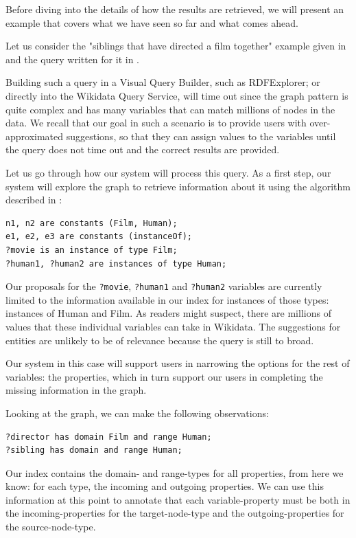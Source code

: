 Before diving into the details of how the results are retrieved, we will present an example that covers what we have seen so far and what comes ahead.

\begin{example}

Let us consider the "siblings that have directed a film together" example given in  and the query written for it in .

Building such a query in a Visual Query Builder, such as RDFExplorer; or directly into the Wikidata Query Service, will time out since the graph pattern is quite complex and has many variables that can match millions of nodes in the data. We recall that our goal in such a scenario is to provide users with over-approximated suggestions, so that they can assign values to the variables until the query does not time out and the correct results are provided.

Let us go through how our system will process this query. 
As a first step, our system will explore the graph to retrieve information about it using the algorithm described in :
\begin{verbatim}
n1, n2 are constants (Film, Human);
e1, e2, e3 are constants (instanceOf);
?movie is an instance of type Film;
?human1, ?human2 are instances of type Human;
\end{verbatim}

Our proposals for the \texttt{?movie}, \texttt{?human1} and \texttt{?human2} variables are currently limited to the information available in our index for instances of those types: instances of Human and Film. As readers might suspect, there are millions of values that these individual variables can take in Wikidata. The suggestions for entities are unlikely to be of relevance because the query is still to broad.

Our system in this case will support users in narrowing the options for the rest of variables: the properties, which in turn support our users in completing the missing information in the graph.

Looking at the graph, we can make the following observations:
\begin{verbatim}
?director has domain Film and range Human;
?sibling has domain and range Human;
\end{verbatim}

Our index contains the domain- and range-types for all properties, from here we know: for each type, the incoming and outgoing properties. 
We can use this information at this point to annotate that each variable-property must be both in the incoming-properties for the target-node-type and the outgoing-properties for the source-node-type.


\end{example}
